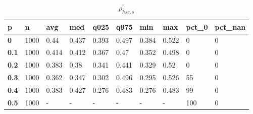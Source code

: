 \begin{table}[h]
 \centering 
\footnotesize
\caption{$\rho_{hsc,s}^\prime $}
\label{tab:alphahscs}
\begin{tabular}[h]{|l|l|l|l|l|l|l|l|l|l|
    } \hline
\textbf{ p} & \textbf{ n} & \textbf{ avg} & \textbf{ med} & \textbf{ q025} & \textbf{ q975} & \textbf{ min} & \textbf{ max} & \textbf{ pct\_0} & \textbf{ pct\_nan}
    \\ \hline
  \textbf{  0} & 1000 &  0.44 & 0.437 & 0.393 & 0.497 & 0.384 & 0.522 &   0 & 0
    \\ \hline
  \textbf{0.1} & 1000 & 0.414 & 0.412 & 0.367 &  0.47 & 0.352 & 0.498 &   0 & 0
    \\ \hline
  \textbf{0.2} & 1000 & 0.383 &  0.38 & 0.341 & 0.441 & 0.329 &  0.52 &   0 & 0
    \\ \hline
  \textbf{0.3} & 1000 & 0.362 & 0.347 & 0.302 & 0.496 & 0.295 & 0.526 &  55 & 0
    \\ \hline
  \textbf{0.4} & 1000 & 0.383 & 0.427 & 0.276 & 0.483 & 0.276 & 0.483 &  99 & 0
    \\ \hline
  \textbf{0.5} & 1000 & - & - & - & - & - & - & 100 & 0
    \\ \hline
 \end{tabular}
 \end{table}
